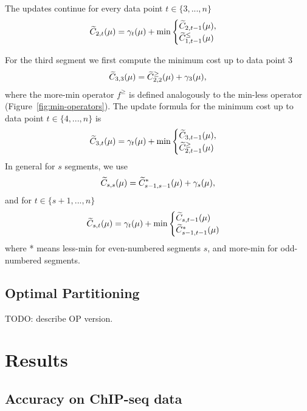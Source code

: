 \documentclass{article}
\begin{document}
The updates continue for every data point $t\in\{3, ..., n\}$
\begin{equation*}
  \widetilde{C}_{2,t}(\mu) =  \gamma_t(\mu) + \min
  \begin{cases}
    \widetilde{C}_{2,t-1}(\mu),\\
    \widetilde{C}_{1,t-1}^{\leq}(\mu) 
  \end{cases}
\end{equation*}

For the third segment we first compute the minimum cost up to data point 3
\begin{equation*}
  \widetilde{C}_{3,3}(\mu) = \widetilde{C}_{2,2}^{\geq}(\mu) + \gamma_3(\mu),
\end{equation*}
where the more-min operator $f^\geq$ is defined analogously to the
min-less operator (Figure~\ref{fig:min-operators}). The update formula
for the minimum cost up to data point $t\in\{4, ..., n\}$ is
\begin{equation*}
  \widetilde{C}_{3,t}(\mu) = \gamma_t(\mu) + \min
  \begin{cases}
    \widetilde{C}_{3,t-1}(\mu),\\
    \widetilde{C}_{2,t-1}^{\geq}(\mu)
  \end{cases}
\end{equation*}
In general for $s$ segments, we use
\begin{equation}
  \widetilde{C}_{s,s}(\mu) = \widetilde{C}_{s-1,s-1}^{*}(\mu) + \gamma_s(\mu),
\end{equation}
and for $t\in\{s+1, ..., n\}$
\begin{equation}
  \widetilde{C}_{s,t}(\mu) = \gamma_t(\mu)+\min
  \begin{cases}
    \widetilde{C}_{s,t-1}(\mu)\\
    \widetilde{C}_{s-1,t-1}^{*}(\mu)
  \end{cases}
\end{equation}
where * means less-min for even-numbered segments $s$, and more-min
for odd-numbered segments.

\subsection{Optimal Partitioning}

TODO: describe OP version.

\section{Results}

\subsection{Accuracy on ChIP-seq data}
\end{document}
